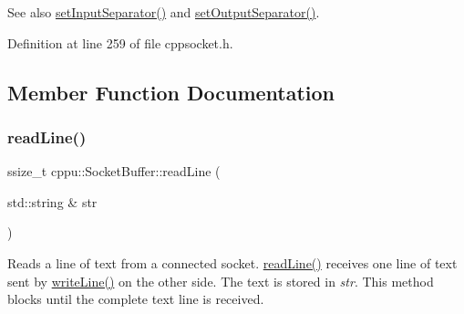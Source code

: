 \begin{DoxySeeAlso}{See also}
\mbox{\hyperlink{classcppu_1_1_socket_buffer_acadf4540c1e3eba67b014753b84b482c}{set\+Input\+Separator()}} and \mbox{\hyperlink{classcppu_1_1_socket_buffer_a0e5e6a9ce3bda28b65c559c8b3c91b0f}{set\+Output\+Separator()}}. 
\end{DoxySeeAlso}


Definition at line 259 of file cppsocket.\+h.



\subsection{Member Function Documentation}
\mbox{\label{classcppu_1_1_socket_buffer_a222769d3776b9cbd3a727ee1f0e60358}} 
\subsubsection{\texorpdfstring{readLine()}{readLine()}}
{\footnotesize\ttfamily ssize\+\_\+t cppu\+::\+Socket\+Buffer\+::read\+Line (\begin{DoxyParamCaption}\item[{std\+::string \&}]{str }\end{DoxyParamCaption})\hspace{0.3cm}{\ttfamily [virtual]}}



Reads a line of text from a connected socket. \mbox{\hyperlink{classcppu_1_1_socket_buffer_a222769d3776b9cbd3a727ee1f0e60358}{read\+Line()}} receives one line of text sent by \mbox{\hyperlink{classcppu_1_1_socket_buffer_a92ae0351aaee8719d34e8c4618495d59}{write\+Line()}} on the other side. The text is stored in {\itshape str}. This method blocks until the complete text line is received. 

